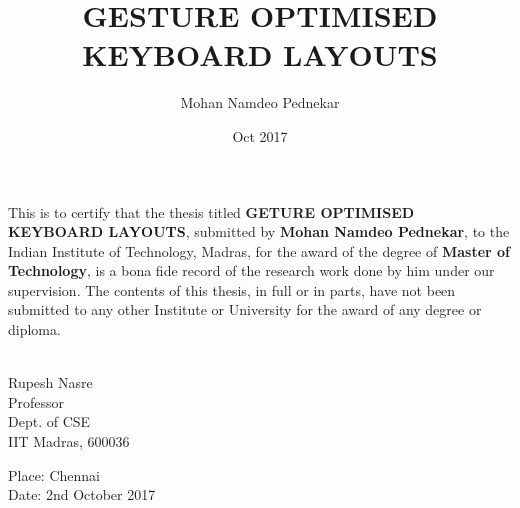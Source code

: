 \documentclass[MTech]{iitmdiss}
\begin{document}

\title{GESTURE OPTIMISED KEYBOARD LAYOUTS}

\author{Mohan Namdeo Pednekar}

\date{Oct 2017}

\maketitle
\certificate

\vspace*{0.5in}

\noindent This is to certify that the thesis titled {\bf GETURE OPTIMISED KEYBOARD LAYOUTS}, submitted by {\bf Mohan Namdeo Pednekar}, 
  to the Indian Institute of Technology, Madras, for
the award of the degree of {\bf Master of Technology}, is a bona fide
record of the research work done by him under our supervision.  The
contents of this thesis, in full or in parts, have not been submitted
to any other Institute or University for the award of any degree or
diploma.

\vspace*{1.5in}

\begin{singlespacing}
\hspace*{-0.25in}
\parbox{2.5in}{
 \\
\noindent Rupesh Nasre \\ 
\noindent Professor \\
\noindent Dept. of CSE\\
\noindent IIT Madras, 600036
} 
\hspace*{1.0in} 
\end{singlespacing}
\vspace*{0.25in}
\noindent Place: Chennai\\
Date: 2nd October 2017 


\acknowledgements
\end{document}
